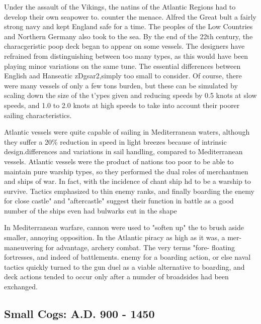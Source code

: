 \documentclass{article}
\begin{document}
\begin{multicols}{3}
Under the assault of the Vikings, the natins of the Atlantic Regions
had to develop their own seapower to. counter the menace. Alfred the
Great bult a fairly strong navy and kept England safe for a time. The
peoples of the Low Countries and Northern Germany also took to the
sea.  By the end of the 22th century, the characgeristic poop deck
began to appear on some vessels.  The designers have refrained from
distinguishing between too many types, as this would have been playing
minor variations on the same tune.  The essential differences between
English aad Hanseatic zDgsar2,simply too small to consider.  Of
course, there were many vessels of only a few tons burden, but these
can be simulated by scaling down the size of the t'ypes given and
reducing speeds by 0.5 knots at slow speeds, and 1.0 to 2.0 knots at
high speeds to take into account their poorer sailing characteristics.

Atlantic vessels were quite capable of sailing in Mediterranean
waters, although they suffer a 20\% reduction in speed in light
breezes because of intrinsic design.differences and variations in sail
handling, compared to Mediterranean vessels.  Atlantic vessels were
the product of nations too poor to be able to maintain pure warship
types, so they performed the dual roles of merchantmen and ships of
war. In fact, with the incidence of chant ship hd to be a warship to
survive.  Tactics emphasized to thin enemy ranks, and finally boarding
the enemy for close castle" and "aftercastle" suggest their function
in battle as a good number of the ships even had bulwarks cut in the
shape

In Mediterranean warfare, cannon were used to "soften up" the to brush
aside smaller, annoying opposition. In the Atlantic piracy as high as
it was, a mer- maneuvering for advantage, archery combat.  The very
terms "fore- floating fortresses, and indeed of battlements.
enemy for a boarding action, or else naval tactics quickly turned to
the gun duel as a viable alternative to boarding, and deck actions
tended to occur only after a numder of broadsides had been exchanged.

\subsection{Small Cogs:  A.D. 900 - 1450}


\end{multicols}
\end{document}
